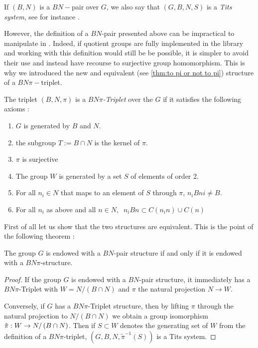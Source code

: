 \begin{notation}
    If $\left( B,N \right)$ is a $BN-$pair over $G$, we also say that $\left( G, B, N, S \right)$ is a \emph{Tits system}, see for instance \cite{bourbaki_groupes_2007}.
\end{notation}

However, the definition of a $BN$-pair presented above can be impractical to manipulate in \Lean. Indeed, if quotient groups are fully implemented in the \Mathlib library and working with this definition would still be be possible, it is simpler to avoid their use and instead have recourse to surjective group homomorphism.
    This is why we introduced the new and equivalent (see \ref{thm:to pi or not to pi}) structure of a $BN\pi-$triplet.  %

\begin{definition}[$BN\pi$-Triplet] \label{BNpi}
  The triplet $\left( B,N, \pi \right)$ is a \emph{$BN\pi$-Triplet} over the $G$ if it satisfies the following axioms :
    \begin{enumerate}
        \item $G$ is generated by $B$ and $N$.
        \item the subgroup $T := B \cap N$ is the kernel of $\pi$.
        \item $\pi$ is surjective
        \item The group $W$ is generated by a set $S$ of elements of order 2.
        \item For all $n_{i} \in N$ that maps to an element of $S$ through $\pi$, $n_{i}Bni \neq B$.
        \item For all $n_{i}$ as above and all $n \in N, \ $ $n_i B n \subset C(n_in) \cup C(n)$
    \end{enumerate}
\end{definition}


First of all let us show that the two structures are equivalent. This is the point of the following theorem :

\begin{theoreme} \label{thm:to pi or not to pi}
    The group $G$ is endowed with a $BN$-pair structure if and only if it is endowed with a $BN\pi$-structure.
\end{theoreme}

\begin{proof}
    If the group $G$ is endowed with a $BN$-pair structure, it immediately has a $BN\pi$-Triplet with $W = N / (B \cap N)$ and $\pi$ the natural projection $N \to W$.

    Conversely, if $G$ has a $BN\pi$-Triplet structure, then by lifting $\pi$ through the natural projection to $N / \left( B \cap N \right)$ we obtain a group isomorphism $\tilde{\pi} : W \to N / \left( B \cap N \right)$. Then if $S \subset W$ denotes the generating set of $W$ from the definition of a $BN\pi$-triplet, $\left(G, B, N, \tilde{\pi}^{-1}\left( S \right)  \right)$ is a Tits system.
\end{proof}

